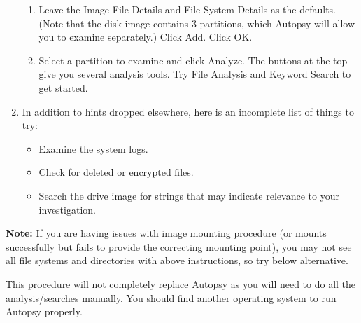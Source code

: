 \documentclass[letterpaper,12pt]{report}
\begin{document}
\begin{enumerate}
\begin{enumerate}
        \item Leave the Image File Details and File System Details as the defaults.  (Note that the disk image contains 3 partitions, which Autopsy will allow you to examine separately.)  Click Add.  Click OK.
        \item Select a partition to examine and click Analyze.  The buttons at the top give you several analysis tools.  Try File Analysis and Keyword Search to get started.
    \end{enumerate}
\item In addition to hints dropped elsewhere, here is an incomplete list of things to try: 
    \begin{itemize}
        \item Examine the system logs.
        \item Check for deleted or encrypted files.
        \item Search the drive image for strings that may indicate relevance to your investigation.
    \end{itemize}

\end{enumerate}

\textbf{Note:} If you are having issues with image mounting procedure (or mounts successfully but fails to provide the correcting mounting point), you may not see all file systems and directories with above instructions, so try below alternative. 

\medskip
This procedure will not completely replace Autopsy as you will need to do all the analysis/searches manually. You should find another operating system to run Autopsy properly.
\end{document}
